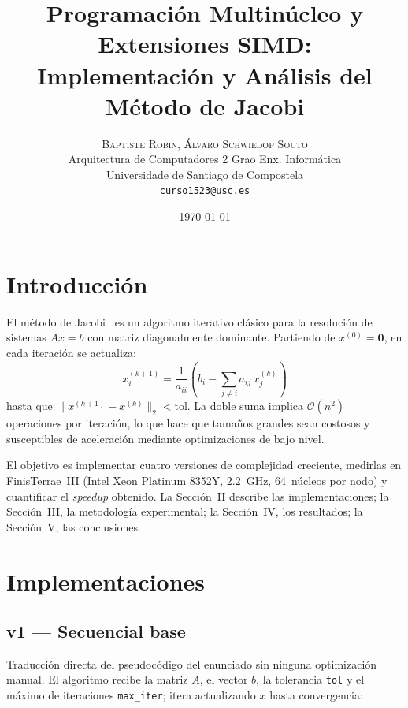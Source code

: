 \documentclass[a4paper,twocolumn]{article}
\title{Programación Multinúcleo y Extensiones SIMD:\\[4pt]
       Implementación y Análisis del Método de Jacobi}
\author{%
  \textsc{Baptiste Robin, Álvaro Schwiedop Souto}\\[0.5ex]
  \normalsize Arquitectura de Computadores \textbullet{} 2\textordmasculine{} Grao Enx. Informática\\
  \normalsize Universidade de Santiago de Compostela\\
  \normalsize \texttt{curso1523@usc.es}
}
\date{\today}
\begin{document}
\maketitle

\section{Introducción}

El método de Jacobi~\cite{saad2003} es un algoritmo iterativo clásico para la
resolución de sistemas $Ax{=}b$ con matriz diagonalmente dominante.  Partiendo de
$x^{(0)}{=}\mathbf{0}$, en cada iteración se actualiza:
\[
  x_i^{(k+1)} = \frac{1}{a_{ii}}\!\left(b_i - \sum_{j \neq i} a_{ij}\,x_j^{(k)}\right)
\]
hasta que $\|x^{(k+1)}-x^{(k)}\|_2 < \text{tol}$.  La doble suma implica
$\mathcal{O}(n^2)$ operaciones por iteración, lo que hace que tamaños grandes
sean costosos y susceptibles de aceleración mediante optimizaciones de bajo nivel.

El objetivo es implementar cuatro versiones de complejidad creciente, medirlas en
FinisTerrae~III (Intel Xeon Platinum 8352Y, 2.2~GHz, 64~núcleos por nodo) y
cuantificar el \textit{speedup} obtenido.  La Sección~II describe las
implementaciones; la Sección~III, la metodología experimental; la Sección~IV,
los resultados; la Sección~V, las conclusiones.

\section{Implementaciones}

\subsection{v1 --- Secuencial base}

Traducción directa del pseudocódigo del enunciado sin ninguna
optimización manual. El algoritmo recibe la matriz $A$, el vector
$b$, la tolerancia \texttt{tol} y el máximo de iteraciones
\texttt{max\_iter}; itera actualizando $x$ hasta convergencia:
\end{document}
